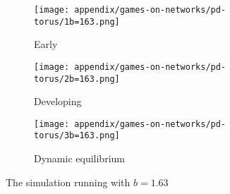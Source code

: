 \begin{figure}
	\centering
	\begin{subfigure}{.3\textwidth}
		\centering
		\texttt{[image: appendix/games-on-networks/pd-torus/1b=163.png]}
		\caption{Early}
		\label{fig:dir}
	\end{subfigure}%
	\begin{subfigure}{.3\textwidth}
		\centering
		\texttt{[image: appendix/games-on-networks/pd-torus/2b=163.png]}
		\caption{Developing}
		\label{fig:loop}
	\end{subfigure}
	\begin{subfigure}{.3\textwidth}
		\centering
		\texttt{[image: appendix/games-on-networks/pd-torus/3b=163.png]}
		\caption{Dynamic equilibrium}
		\label{fig:undirected}
	\end{subfigure}
	\caption{The simulation running with $b=1.63$}
	\label{fig:p-d-torus-1.63}
\end{figure}
